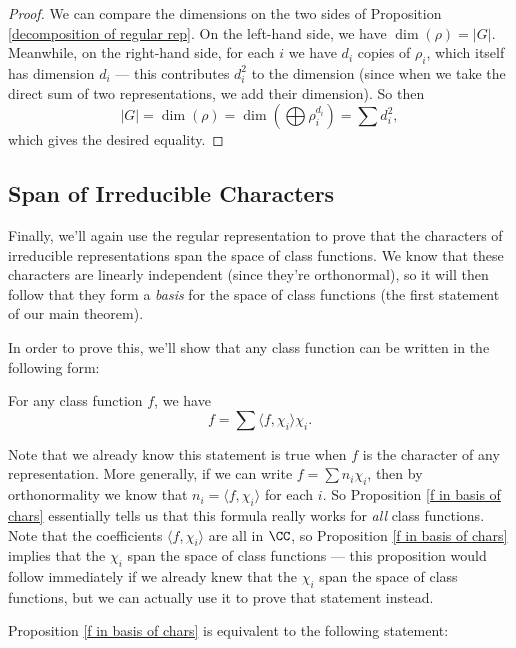 \begin{proof}
    We can compare the dimensions on the two sides of Proposition \ref{decomposition of regular rep}. On the left-hand side, we have $\dim(\rho) = \lvert G \rvert$. Meanwhile, on the right-hand side, for each $i$ we have $d_i$ copies of $\rho_i$, which itself has dimension $d_i$ --- this contributes $d_i^2$ to the dimension (since when we take the direct sum of two representations, we add their dimension). So then \[|G| = \dim(\rho) = \dim\left(\bigoplus \rho_i^{d_i}\right) = \sum d_i^2,\] which gives the desired equality. 
\end{proof}

\subsection{Span of Irreducible Characters}

Finally, we'll again use the regular representation to prove that the characters of irreducible representations span the space of class functions. We know that these characters are linearly independent (since they're orthonormal), so it will then follow that they form a \emph{basis} for the space of class functions (the first statement of our main theorem). 

In order to prove this, we'll show that any class function can be written in the following form:

\begin{proposition} \label{f in basis of chars}
For any class function $f$, we have \[f = \sum \langle f, \chi_i \rangle \chi_i.\] 
\end{proposition}

Note that we already know this statement is true when $f$ is the character of any representation. More generally, if we can write $f = \sum n_i\chi_i$, then by orthonormality we know that $n_i = \langle f, \chi_i \rangle$ for each $i$. So Proposition \ref{f in basis of chars} essentially tells us that this formula really works for \emph{all} class functions. Note that the coefficients $\langle f, \chi_i \rangle$ are all in $\CC$, so Proposition \ref{f in basis of chars} implies that the $\chi_i$ span the space of class functions --- this proposition would follow immediately if we already knew that the $\chi_i$ span the space of class functions, but we can actually use it to prove that statement instead. 

 Proposition \ref{f in basis of chars} is equivalent to the following statement:

